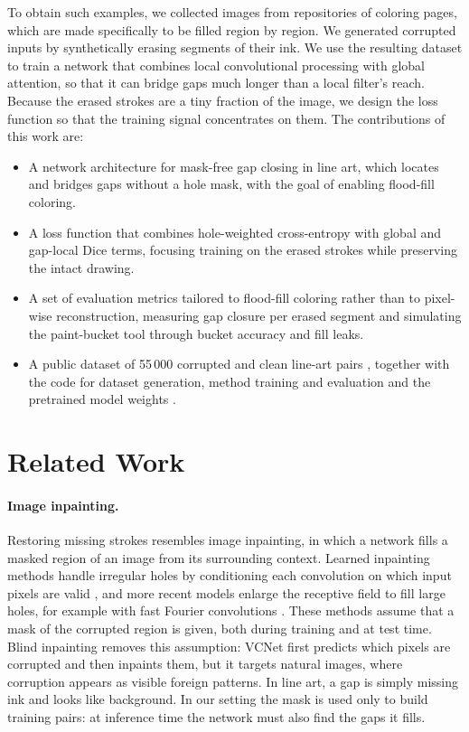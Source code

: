 \documentclass[preprint,12pt]{elsarticle}
\begin{document}
To obtain such examples, we collected images from repositories of coloring pages, which are made specifically to be filled region by region. We generated corrupted inputs by synthetically erasing segments of their ink. We use the resulting dataset to train a network that combines local convolutional processing with global attention, so that it can bridge gaps much longer than a local filter's reach. Because the erased strokes are a tiny fraction of the image, we design the loss function so that the training signal concentrates on them. The contributions of this work are: 

\begin{itemize}
\item A network architecture for mask-free gap closing in line art, which
  locates and bridges gaps without a hole mask, with the goal of enabling
  flood-fill coloring.
\item A loss function that combines hole-weighted cross-entropy with global and
  gap-local Dice terms, focusing training on the erased strokes while preserving
  the intact drawing.
\item A set of evaluation metrics tailored to flood-fill coloring rather than to
  pixel-wise reconstruction, measuring gap closure per erased segment and
  simulating the paint-bucket tool through bucket accuracy and fill leaks.
\item A public dataset of 55\,000 corrupted and clean line-art pairs
  \citep{datasetInkCloser}, together with the code for dataset generation, method
  training and evaluation and the pretrained model weights \citep{codeInkCloser}.
\end{itemize}

\section{Related Work}
\label{sec:related}

\paragraph{Image inpainting.}
Restoring missing strokes resembles image inpainting, in which a network fills a
masked region of an image from its surrounding context. Learned inpainting methods
handle irregular holes by conditioning each convolution on which input pixels are
valid \citep{liu2018partialconv,yu2019gatedconv}, and more recent models enlarge
the receptive field to fill large holes, for example with fast Fourier convolutions
\citep{suvorov2022lama}. These methods assume that a mask of the corrupted region
is given, both during training and at test time. Blind inpainting removes this
assumption: VCNet \citep{wang2020vcnet} first predicts which pixels are corrupted
and then inpaints them, but it targets natural images, where corruption appears as
visible foreign patterns. In line art, a gap is simply missing ink and looks like
background. In our setting the mask is used only to build training pairs: at
inference time the network must also find the gaps it fills.
\end{document}
